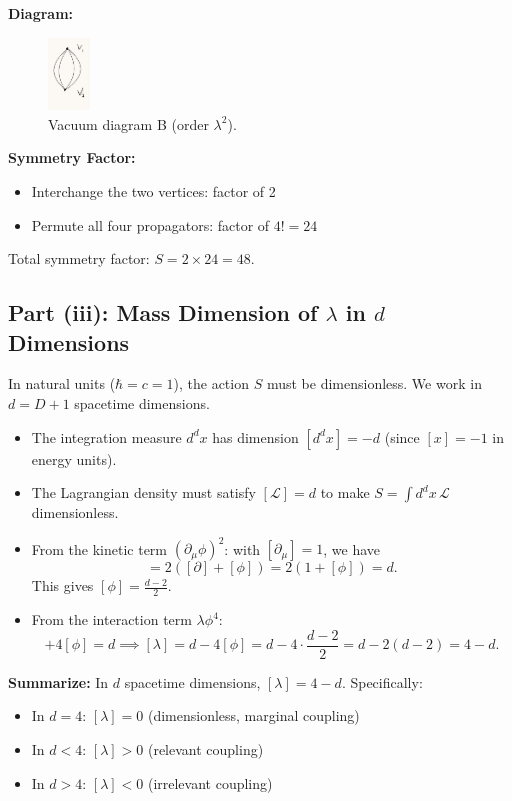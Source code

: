 \documentclass[11pt, a4paper]{article}
\newcommand{\Lscr}{\mathcal{L}}
\newcommand{\be}{\begin{equation}}
\newcommand{\ee}{\end{equation}}
\begin{document}
\textbf{Diagram:}
\begin{figure}[H]
    \centering
    \includegraphics[width=0.1\textwidth]{2-2.jpg}
    \caption{Vacuum diagram B (order $\lambda^2$).}
    \label{fig:figurebbb}
\end{figure}

\textbf{Symmetry Factor:}
\begin{itemize}
    \item Interchange the two vertices: factor of 2
    \item Permute all four propagators: factor of $4! = 24$
\end{itemize}
Total symmetry factor: $S = 2 \times 24 = 48$.


\subsection{Part (iii): Mass Dimension of $\lambda$ in $d$ Dimensions}

In natural units ($\hbar = c = 1$), the action $S$ must be dimensionless. We work in $d = D+1$ spacetime dimensions.

\begin{itemize}
    \item The integration measure $d^dx$ has dimension $[d^dx] = -d$ (since $[x] = -1$ in energy units).
    \item The Lagrangian density must satisfy $[\Lscr] = d$ to make $S = \int d^dx\, \Lscr$ dimensionless.
    \item From the kinetic term $(\partial_\mu\phi)^2$: with $[\partial_\mu] = 1$, we have
    \be
    [(\partial\phi)^2] = 2([\partial] + [\phi]) = 2(1 + [\phi]) = d.
    \ee
    This gives $[\phi] = \frac{d-2}{2}$.
    \item From the interaction term $\lambda\phi^4$:
    \be
    [\lambda] + 4[\phi] = d \implies [\lambda] = d - 4[\phi] = d - 4\cdot\frac{d-2}{2} = d - 2(d-2) = 4 - d.
    \ee
\end{itemize}

\textbf{Summarize:} In $d$ spacetime dimensions, $[\lambda] = 4 - d$. Specifically:
\begin{itemize}
    \item In $d = 4$: $[\lambda] = 0$ (dimensionless, marginal coupling)
    \item In $d < 4$: $[\lambda] > 0$ (relevant coupling)
    \item In $d > 4$: $[\lambda] < 0$ (irrelevant coupling)
\end{itemize}
\end{document}
